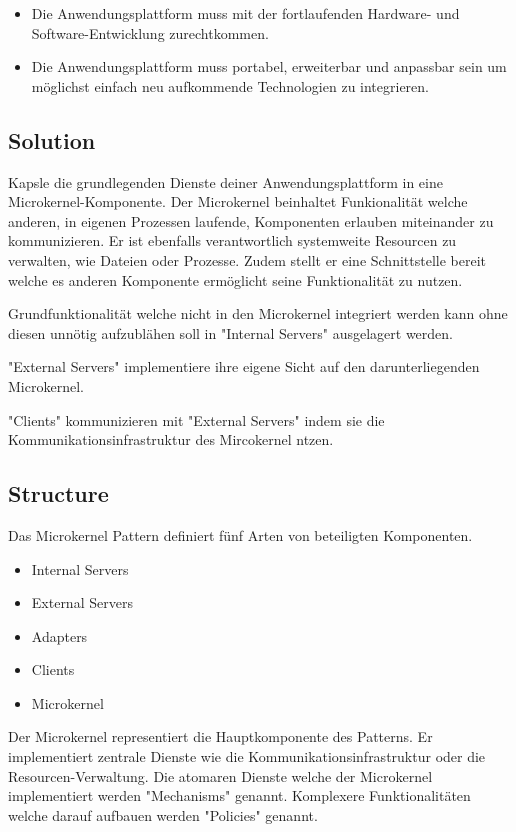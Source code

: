 \begin{itemize}
	\item Die Anwendungsplattform muss mit der fortlaufenden Hardware- und Software-Entwicklung zurechtkommen.
	\item Die Anwendungsplattform muss portabel, erweiterbar und anpassbar sein um möglichst einfach neu aufkommende Technologien zu integrieren.
\end{itemize}

\subsection*{Solution}


Kapsle die grundlegenden Dienste deiner Anwendungsplattform in eine Microkernel-Komponente. Der Microkernel beinhaltet Funkionalität welche anderen, in eigenen Prozessen laufende, Komponenten erlauben miteinander zu kommunizieren. Er ist ebenfalls verantwortlich systemweite Resourcen zu verwalten, wie Dateien oder Prozesse. Zudem stellt er eine Schnittstelle bereit welche es anderen Komponente ermöglicht seine Funktionalität zu nutzen.

Grundfunktionalität welche nicht in den Microkernel integriert werden kann ohne diesen unnötig aufzublähen soll in "Internal Servers" ausgelagert werden.

"External Servers" implementiere ihre eigene Sicht auf den darunterliegenden Microkernel.

"Clients" kommunizieren mit "External Servers" indem sie die Kommunikationsinfrastruktur des Mircokernel ntzen.

\subsection*{Structure}


Das Microkernel Pattern definiert fünf Arten von beteiligten Komponenten.

\begin{itemize}
	\item Internal Servers
	\item External Servers
	\item Adapters
	\item Clients
	\item Microkernel
\end{itemize}

Der Microkernel representiert die Hauptkomponente des Patterns. Er implementiert zentrale Dienste wie die Kommunikationsinfrastruktur oder die Resourcen-Verwaltung. Die atomaren Dienste welche der Microkernel implementiert werden "Mechanisms" genannt. Komplexere Funktionalitäten welche darauf aufbauen werden "Policies" genannt.

